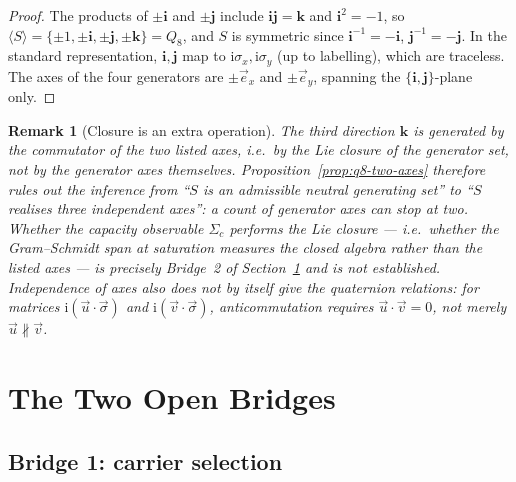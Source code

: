 \documentclass[11pt,a4paper]{article}
\newtheorem{remark}[theorem]{Remark}
\begin{document}
    \begin{proof}
      The products of $\pm\mathbf{i}$ and $\pm\mathbf{j}$ include
      $\mathbf{i}\mathbf{j} = \mathbf{k}$ and $\mathbf{i}^{2} = -1$, so
      $\langle S \rangle = \{\pm 1, \pm\mathbf{i}, \pm\mathbf{j}, \pm\mathbf{k}\} =
      Q_{8}$, and $S$ is symmetric since $\mathbf{i}^{-1} = -\mathbf{i}$,
      $\mathbf{j}^{-1} = -\mathbf{j}$.
      In the standard representation, $\mathbf{i}, \mathbf{j}$ map to
      $\mathrm{i}\sigma_{x}, \mathrm{i}\sigma_{y}$ (up to labelling), which are traceless.
      The axes of the four generators are $\pm\vec{e}_{x}$ and $\pm\vec{e}_{y}$, spanning
      the $\{\mathbf{i},\mathbf{j}\}$-plane only.
    \end{proof}

    \begin{remark}[Closure is an extra operation]
      \label{rem:closure-extra}
      The third direction $\mathbf{k}$ is generated by the \emph{commutator} of the two
      listed axes, i.e.\ by the Lie closure of the generator set, not by the generator
      axes themselves.
      Proposition~\ref{prop:q8-two-axes} therefore rules out the inference from ``$S$ is
      an admissible neutral generating set'' to ``$S$ realises three independent axes'':
      a count of generator axes can stop at two.
      Whether the capacity observable $\Sigma_{c}$ performs the Lie closure --- i.e.\
      whether the Gram--Schmidt span at saturation measures the closed algebra rather
      than the listed axes --- is precisely Bridge~2 of Section~\ref{sec:bridges} and is
      not established.
      Independence of axes also does not by itself give the quaternion relations: for
      matrices $\mathrm{i}(\vec{u} \cdot \vec{\sigma})$ and
      $\mathrm{i}(\vec{v} \cdot \vec{\sigma})$, anticommutation requires
      $\vec{u} \cdot \vec{v} = 0$, not merely $\vec{u} \nparallel \vec{v}$.
    \end{remark}

  \section{The Two Open Bridges}
  \label{sec:bridges}

  \subsection{Bridge 1: carrier selection}
    \label{ssec:carrier-bridge}
\end{document}
